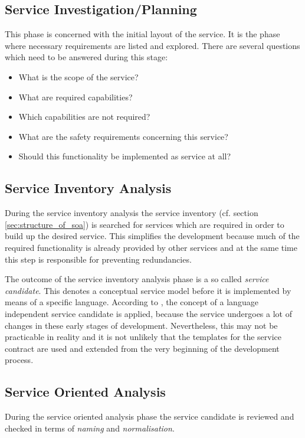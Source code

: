 \subsection{Service Investigation/Planning}
This phase is concerned with the initial layout of the service. It is the phase where necessary requirements are listed and explored. There are several questions which need to be answered during this stage:
\begin{itemize}
\item What is the scope of the service?
\item What are required capabilities?
\item Which capabilities are not required?
\item What are the safety requirements concerning this service?
\item Should this functionality be implemented as service at all?
\end{itemize}



\subsection{Service Inventory Analysis}

During the service inventory analysis the service inventory (cf. section \ref{sec:structure_of_soa}) is searched for services which are required in order to build up the desired service. This simplifies the development because much of the required functionality is already provided by other services and at the same time this step is responsible for preventing redundancies.

The outcome of the service inventory analysis phase is a so called \emph{service candidate}. This denotes a conceptual service model before it is implemented by means of a specific language. According to \cite[p.42]{erl2011}, the concept of a language independent service candidate is applied, because the service undergoes a lot of changes in these early stages of development. Nevertheless, this may not be practicable in reality and it is not unlikely that the templates for the service contract are used and extended from the very beginning of the development process.

\subsection{Service Oriented Analysis}

During the service oriented analysis phase the service candidate is reviewed and checked in terms of \emph{naming} and \emph{normalisation}.


